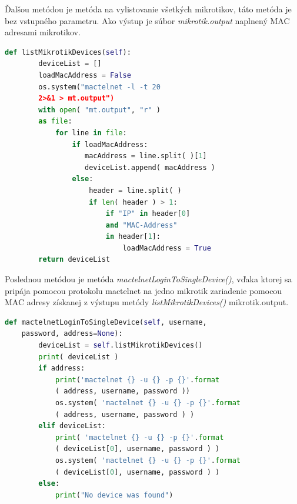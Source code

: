 Ďalšou metódou je metóda na vylistovanie všetkých mikrotikov, táto metóda je bez vstupného parametru. Ako výstup je súbor \textit{mikrotik.output} naplnený MAC adresami mikrotikov. 
\begin{lstlisting}[language=python, frame=single, caption=Metóda listMikrotikDevices,captionpos=b, showstringspaces=false, basicstyle=\footnotesize] 
def listMikrotikDevices(self):
        deviceList = []
        loadMacAddress = False
        os.system("mactelnet -l -t 20 
        2>&1 > mt.output")
        with open( "mt.output", "r" ) 
        as file:
            for line in file:
                if loadMacAddress:
                   macAddress = line.split( )[1]
                   deviceList.append( macAddress )
                else:
                    header = line.split( )
                    if len( header ) > 1:
                        if "IP" in header[0] 
                        and "MAC-Address" 
                        in header[1]:
                            loadMacAddress = True
        return deviceList
\end{lstlisting}
Poslednou metódou je metóda \textit{mactelnetLoginToSingleDevice()}, vďaka ktorej sa pripája pomocou protokolu mactelnet na jedno mikrotik zariadenie pomocou MAC adresy získanej z výstupu metódy \textit{listMikrotikDevices()} mikrotik.output.
\begin{lstlisting}[language=python, frame=single, caption=Metóda mactelnetLoginToSingleDevice,captionpos=b, showstringspaces=false, basicstyle=\footnotesize] 
def mactelnetLoginToSingleDevice(self, username, 
    password, address=None):
        deviceList = self.listMikrotikDevices()
        print( deviceList )
        if address:
            print('mactelnet {} -u {} -p {}'.format
            ( address, username, password ))
            os.system( 'mactelnet {} -u {} -p {}'.format
            ( address, username, password ) )
        elif deviceList:
            print( 'mactelnet {} -u {} -p {}'.format
            ( deviceList[0], username, password ) )
            os.system( 'mactelnet {} -u {} -p {}'.format
            ( deviceList[0], username, password ) )
        else:
            print("No device was found")
\end{lstlisting}
